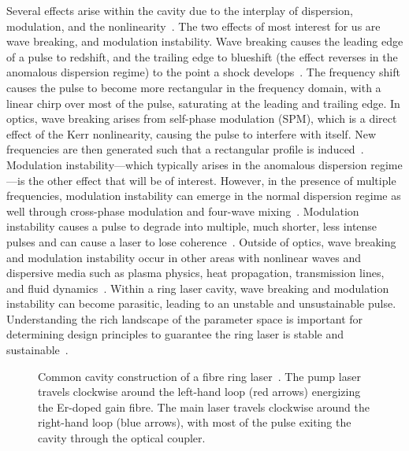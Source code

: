 \documentclass[9pt,twocolumn,twoside]{osajnl}
\begin{document}
Several effects arise within the cavity due to the interplay of dispersion, modulation, and the nonlinearity~\cite{bohun2015, coen1997, lapre2019, meng2020, oktem2010, shao2019, woodward2018}. The two effects of most interest for us are wave breaking, and modulation instability. Wave breaking causes the leading edge of a pulse to redshift, and the trailing edge to blueshift (the effect reverses in the anomalous dispersion regime) to the point a shock develops~\cite{anderson1992, rothenberg1989a, rothenberg1989b, tomlinson1984, tomlinson1985}. The frequency shift causes the pulse to become more rectangular in the frequency domain, with a linear chirp over most of the pulse, saturating at the leading and trailing edge. In optics, wave breaking arises from self-phase modulation (SPM), which is a direct effect of the Kerr nonlinearity, causing the pulse to interfere with itself. New frequencies are then generated such that a rectangular profile is induced~\cite{agrawal2013, woodward2018}. Modulation instability---which typically arises in the anomalous dispersion regime---is the other effect that will be of interest. However, in the presence of multiple frequencies, modulation instability can emerge in the normal dispersion regime as well through cross-phase modulation and four-wave mixing~\cite{agrawal1987, agrawal2013, haelterman1992}. Modulation instability causes a pulse to degrade into multiple, much shorter, less intense pulses and can cause a laser to lose coherence~\cite{agrawal1987, coen1997, haelterman1992}. Outside of optics, wave breaking and modulation instability occur in other areas with nonlinear waves and dispersive media such as plasma physics, heat propagation, transmission lines, and fluid dynamics~\cite{coen1997, rothenberg1989b}. Within a ring laser cavity, wave breaking and modulation instability can become parasitic, leading to an unstable and unsustainable pulse. Understanding the rich landscape of the parameter space is important for determining design principles to guarantee the ring laser is stable and sustainable~\cite{bohun2015, burgoyneemail, finot2008, lapre2019, woodward2018}.

\begin{figure}[tbp]
	\centering
	
	\caption{Common cavity construction of a fibre ring laser~\cite{burgoyne2014, chung2017, lapre2019, shao2019}. The pump laser travels clockwise around the left-hand loop (red arrows) energizing the Er-doped gain fibre. The main laser travels clockwise around the right-hand loop (blue arrows), with most of the pulse exiting the cavity through the optical coupler.}
	\label{fig:cavity}
\end{figure}
\end{document}
